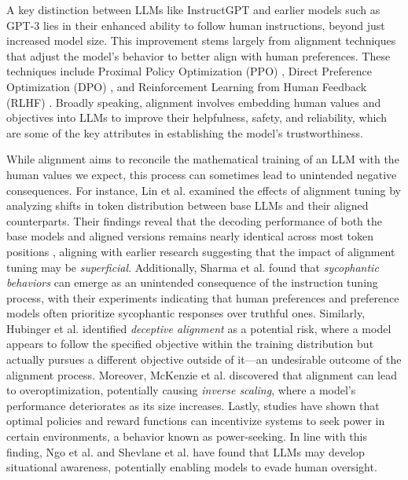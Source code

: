 A key distinction between LLMs like InstructGPT \cite{ouyang2022training} and earlier models such as GPT-3 \cite{brown2020language} lies in their enhanced ability to follow human instructions, beyond just increased model size. This improvement stems largely from alignment techniques that adjust the model's behavior to better align with human preferences. These techniques include Proximal Policy Optimization (PPO) \cite{schulman2017proximal}, Direct Preference Optimization (DPO) \cite{rafailov2024direct}, and Reinforcement Learning from Human Feedback (RLHF) \cite{ouyang2022training}. Broadly speaking, alignment \cite{shen2023large, ji2023ai, wang2024comprehensive, wang2023aligning, yao2023instructions, cao2024towards, liu2023trustworthy} involves embedding human values and objectives into LLMs to improve their helpfulness, safety, and reliability, which are some of the key attributes in establishing the model's trustworthiness.

While alignment aims to reconcile the mathematical training of an LLM with the human values we expect, this process can sometimes lead to unintended negative consequences. For instance, Lin et al. \cite{lin2023unlocking} examined the effects of alignment tuning by analyzing shifts in token distribution between base LLMs and their aligned counterparts. Their findings reveal that the decoding performance of both the base models and aligned versions remains nearly identical across most token positions \cite{lin2023unlocking}, aligning with earlier research \cite{zhou2024lima} suggesting that the impact of alignment tuning may be \textit{superficial}.
Additionally, Sharma et al. \cite{sharma2023understanding} found that \textit{sycophantic behaviors} can emerge as an unintended consequence of the instruction tuning process, with their experiments indicating that human preferences and preference models often prioritize sycophantic responses over truthful ones. Similarly, Hubinger et al. \cite{hubinger2019risks} identified \textit{deceptive alignment} as a potential risk, where a model appears to follow the specified objective within the training distribution but actually pursues a different objective outside of it—an undesirable outcome of the alignment process.
Moreover, McKenzie et al. \cite{mckenzie2023inverse} discovered that alignment can lead to overoptimization, potentially causing \textit{inverse scaling}, where a model's performance deteriorates as its size increases. Lastly, studies \cite{turner2019optimal, turner2022parametrically, krakovna2023power} have shown that optimal policies and reward functions can incentivize systems to seek power in certain environments, a behavior known as power-seeking.
In line with this finding, Ngo et al. \cite{ngo2022alignment} and Shevlane et al. \cite{shevlane2023model} have found that LLMs may develop situational awareness, potentially enabling models to evade human oversight.

